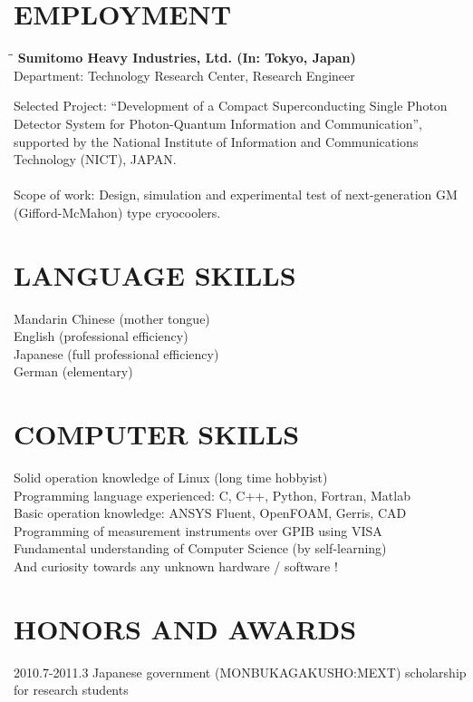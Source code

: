 \documentclass[12pt,A4]{res}
\makeatletter
\newlength\tdima
\newcommand\tabright[1]{%
      \setlength\tdima{\linewidth}%
      \addtolength\tdima{\@totalleftmargin}%
      \addtolength\tdima{-\dimen\@curtab}%
      \makebox[\tdima][r]{#1}}
\makeatother
\begin{document}
\begin{resume}
\section{EMPLOYMENT}
    \vspace{-0.1in}	    
    \begin{tabbing}
    \hspace{2.2in}\= \hspace{2.1in}\= \kill %
    {\bf Sumitomo Heavy Industries, Ltd. (In: Tokyo, Japan)} \> \tabright{2013.4-Present} \\
    Department: Technology Research Center, Research Engineer \\
   \end{tabbing}\vspace{-20pt}      %

    Selected Project: “Development of a Compact Superconducting Single Photon
    Detector System for Photon-Quantum Information and Communication”, supported by
    the National Institute of Information and Communications Technology (NICT), JAPAN. \\
    \\
    Scope of work: Design, simulation and experimental test of next-generation GM (Gifford-McMahon) type cryocoolers.\\   
     
\section{LANGUAGE SKILLS}
Mandarin Chinese (mother tongue) \\
English (professional efficiency) \\
Japanese (full professional efficiency) \\
German (elementary)     

\section{COMPUTER SKILLS}          
Solid operation knowledge of Linux (long time hobbyist) \\
Programming language experienced: C, C++, Python, Fortran, Matlab \\
Basic operation knowledge: ANSYS Fluent, OpenFOAM, Gerris, CAD \\
Programming of measurement instruments over GPIB using VISA \\
Fundamental understanding of Computer Science (by self-learning) \\
And curiosity towards any unknown hardware / software !
 
\section{HONORS AND AWARDS}          
2010.7-2011.3 Japanese government (MONBUKAGAKUSHO:MEXT) scholarship for research students\\

\end{resume}
\end{document}
